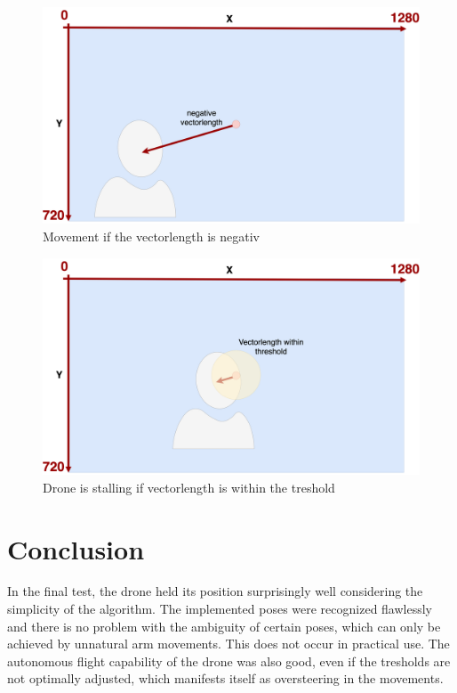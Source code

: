 \documentclass[a4paper,11pt,singlespacing]{article}
\begin{document}
\begin{figure}[H]
	\centering
	\includegraphics[width=\textwidth]{images/negative_vector_length.png}
	\caption{Movement if the vectorlength is negativ}
	\label{negativ_vectortlength}
\end{figure}

\begin{figure}[H]
	\centering
	\includegraphics[width=\textwidth]{images/vectorlength_between_treshold.png}
	\caption{Drone is stalling if vectorlength is within the treshold}
	\label{vectorlength_treshold}
\end{figure}



\pagebreak
\section{Conclusion}
In the final test, the drone held its position surprisingly well considering the simplicity of the algorithm.
The implemented poses were recognized flawlessly and there is no problem with the ambiguity of certain poses, which can only be achieved by unnatural arm movements.
This does not occur in practical use.
The autonomous flight capability of the drone was also good, even if the tresholds are not optimally adjusted, which manifests itself as oversteering in the movements.
\end{document}
